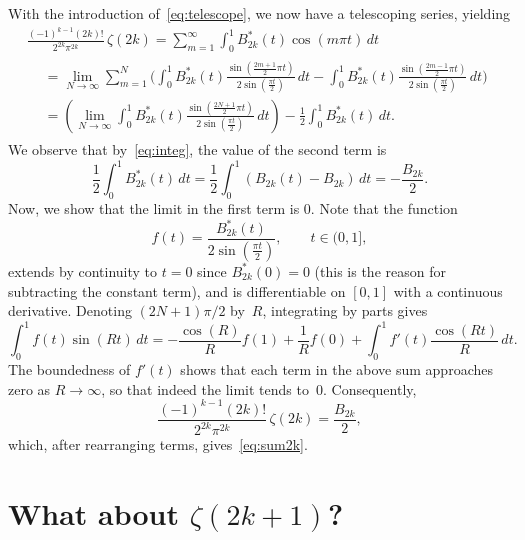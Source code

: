 \documentclass[10pt,reqno]{amsart}
\theoremstyle{remark}
\begin{document}
With the introduction of~\eqref{eq:telescope}, we now have a telescoping series, yielding
%
\begin{multline*}
     \frac{(-1)^{k-1}(2k)!}{2^{2k} \pi^{2k}} \, \zeta(2k) 
     = \sum_{m=1}^{\infty} \int_0^{1} B^{*}_{2k}(t) \cos(m\pi t)\,dt
  \\
  \begin{aligned}
  &= \lim_{N \to \infty} \sum_{m=1}^{N} \Bigg( 
    \int_0^{1} B^{*}_{2k}(t) \frac{\sin(\frac{2m+1}{2}\pi t)}{2\sin(\frac{\pi t}{2})}\,dt
    - \int_0^{1} B^{*}_{2k}(t) \frac{\sin(\frac{2m-1}{2}\pi t)}{2\sin(\frac{\pi t}{2})}\,dt
  \Bigg) 
  \\
  &= \left(\lim_{N \to \infty} \int_0^{1} B^{*}_{2k}(t) 
    \frac{\sin(\frac{2N+1}{2}\pi t)}{2\sin(\frac{\pi t}{2})}\,dt\right)
  - \frac{1}{2} \int_0^{1} B^{*}_{2k}(t) \,dt.
  \end{aligned}
\end{multline*}
%
We observe that by~\eqref{eq:integ}, the value of the second term is
\[
    \frac12 \int_0^{1} B^{*}_{2k}(t) \,dt
  = \frac12 \int_0^{1} (B_{2k}(t)-B_{2k}) \,dt
  = - \frac{B_{2k}}{2}.
\]
Now, we show that the limit in the first term is $0$. Note that the function
\[
  f(t) = \frac{B^{*}_{2k}(t)}{2\sin(\frac{\pi t}{2})}, \qquad t \in (0,1],
\] 
extends by continuity to $t=0$ since $B^{*}_{2k}(0)=0$ (this is the reason for subtracting the constant term), and is differentiable on $[0,1]$ with a continuous derivative. Denoting $(2N + 1)\pi/2$ by~$R$, integrating by parts gives
\[
  \int_0^1 f(t) \sin(Rt)\,dt 
  = - \frac{\cos(R)}{R} f(1) + \frac{1}{R} f(0) + \int_0^1 f'(t) \frac{\cos(Rt)}{R} \,dt.
\]
The boundedness of $f'(t)$ shows that each term in the above sum approaches zero as $R \to \infty$, so that indeed the limit tends to~$0$.
Consequently,
\[
  \frac{(-1)^{k-1}(2k)!}{2^{2k}\pi^{2k}} \,\zeta(2k) = \frac{B_{2k}}{2},
\]
which, after rearranging terms, gives~\eqref{eq:sum2k}.

\section{What about $\zeta(2k+1)$?}
\end{document}
